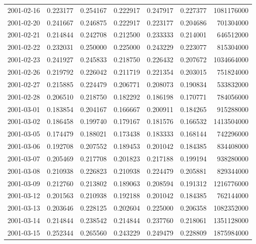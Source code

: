 \begin{tabular}{lrrrrrr}
2001-02-16 &    0.223177 &    0.254167 &    0.222917 &    0.247917 &    0.227377 &  1081176000 \\
2001-02-20 &    0.241667 &    0.246875 &    0.222917 &    0.223177 &    0.204686 &   701304000 \\
2001-02-21 &    0.214844 &    0.242708 &    0.212500 &    0.233333 &    0.214001 &   646512000 \\
2001-02-22 &    0.232031 &    0.250000 &    0.225000 &    0.243229 &    0.223077 &   815304000 \\
2001-02-23 &    0.241927 &    0.245833 &    0.218750 &    0.226432 &    0.207672 &  1034664000 \\
2001-02-26 &    0.219792 &    0.226042 &    0.211719 &    0.221354 &    0.203015 &   751824000 \\
2001-02-27 &    0.215885 &    0.224479 &    0.206771 &    0.208073 &    0.190834 &   533832000 \\
2001-02-28 &    0.206510 &    0.218750 &    0.182292 &    0.186198 &    0.170771 &   784056000 \\
2001-03-01 &    0.183854 &    0.204167 &    0.166667 &    0.200911 &    0.184265 &   915288000 \\
2001-03-02 &    0.186458 &    0.199740 &    0.179167 &    0.181576 &    0.166532 &  1413504000 \\
2001-03-05 &    0.174479 &    0.188021 &    0.173438 &    0.183333 &    0.168144 &   742296000 \\
2001-03-06 &    0.192708 &    0.207552 &    0.189453 &    0.201042 &    0.184385 &   834408000 \\
2001-03-07 &    0.205469 &    0.217708 &    0.201823 &    0.217188 &    0.199194 &   938280000 \\
2001-03-08 &    0.210938 &    0.226823 &    0.210938 &    0.224479 &    0.205881 &   829344000 \\
2001-03-09 &    0.212760 &    0.213802 &    0.189063 &    0.208594 &    0.191312 &  1216776000 \\
2001-03-12 &    0.201563 &    0.210938 &    0.192188 &    0.201042 &    0.184385 &   762144000 \\
2001-03-13 &    0.203646 &    0.228125 &    0.202604 &    0.225000 &    0.206358 &  1082352000 \\
2001-03-14 &    0.214844 &    0.238542 &    0.214844 &    0.237760 &    0.218061 &  1351128000 \\
2001-03-15 &    0.252344 &    0.265560 &    0.243229 &    0.249479 &    0.228809 &  1875984000 \\

\end{tabular}
